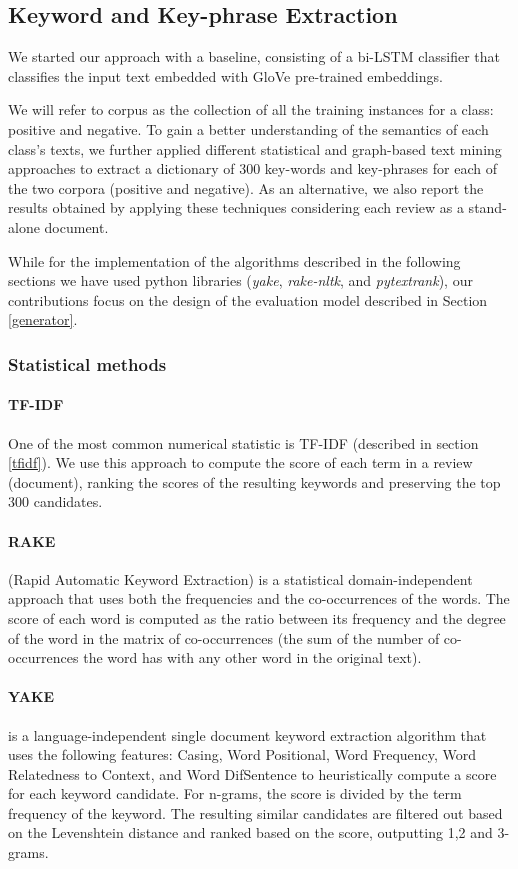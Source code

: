 \subsection{Keyword and Key-phrase Extraction} \label{keyword}

We started our approach with a baseline, consisting of a bi-LSTM classifier that classifies the input text embedded with GloVe pre-trained embeddings.

We will refer to corpus as the collection of all the training instances for a class: positive and negative.
To gain a better understanding of the semantics of each class's texts, we further applied different statistical and graph-based text mining approaches to extract a dictionary of 300 key-words and key-phrases for each of the two corpora (positive and negative). As an alternative, we also report the results obtained by applying these techniques considering each review as a stand-alone document.

While for the implementation of the algorithms described in the following sections we have used python libraries (\textit{yake}, \textit{rake-nltk}, and \textit{pytextrank}), our contributions focus on the design of the evaluation model described in Section \ref{generator}. 
\subsubsection{Statistical methods}
\paragraph{TF-IDF}
One of the most common numerical statistic is TF-IDF (described in section \ref{tfidf}). We use this approach to compute the score of each term in a review (document), ranking the scores of the resulting keywords and preserving the top 300 candidates.
\paragraph{RAKE} (Rapid Automatic Keyword Extraction) \cite{rake} is a statistical domain-independent approach that uses both the frequencies and the co-occurrences of the words. The score of each word is computed as the ratio between its frequency and the degree of the word in the matrix of co-occurrences (the sum of the number of co-occurrences the word has with any other word in the original text).    

\paragraph{YAKE} \cite{yake} is a language-independent single document keyword extraction algorithm that uses the following features: Casing, Word Positional, Word Frequency, Word Relatedness to Context, and Word DifSentence to heuristically compute a score for each keyword candidate. For n-grams, the score is divided by the term frequency of the keyword. The resulting similar candidates are filtered out based on the Levenshtein \cite{Levenshtein} distance and ranked based on the score, outputting 1,2 and 3-grams.
